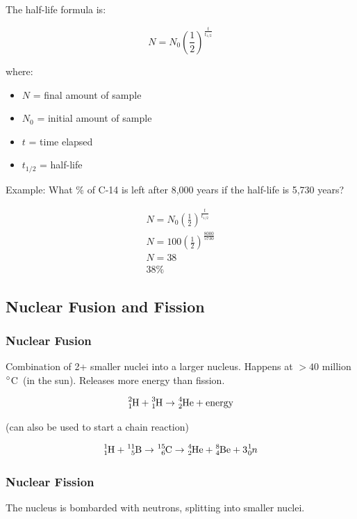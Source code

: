 \documentclass[a4paper, 12pt]{article}
\newcommand{\degC}{$\degree$C \,}
\begin{document}
The half-life formula is:

\begin{equation}\label{eq:halflife}
N = N_0 \left(\frac{1}{2}\right)^{\frac{t}{t_{1/2}}}
\end{equation}

where:

\begin{itemize}[leftmargin=*, nosep]
\item $N$ = final amount of sample
\item $N_0$ = initial amount of sample
\item $t$ = time elapsed
\item $t_{1/2}$ = half-life
\end{itemize}

Example: What \% of C-14 is left after 8,000 years if the half-life is 5,730 years?

\begin{gather*}
N = N_0 \left(\frac{1}{2}\right)^{\frac{t}{t_{1/2}}} \\
N = 100 \left(\frac{1}{2}\right)^{\frac{8000}{5730}} \\
N = 38 \\
\boxed{38\%}
\end{gather*}

\subsection{Nuclear Fusion and Fission}

\subsubsection{Nuclear Fusion}
Combination of 2+ smaller nuclei into a larger nucleus. Happens at $>40$ million \degC (in the sun). Releases more energy than fission.

$$\ce{^{2}_{1}H} + \ce{^{3}_{1}H} \to \ce{^{4}_{2}He} + \mathrm{energy}$$

(can also be used to start a chain reaction)

$$\ce{^{1}_{1}H} + \ce{^{11}_{5}B} \to \ce{^{15}_{6}C} \to \ce{^{4}_{2}He} + \ce{^{8}_{4}Be} + 3\ce{^{1}_{0}$n$}$$

\subsubsection{Nuclear Fission}
The nucleus is bombarded with neutrons, splitting into smaller nuclei.
\end{document}
